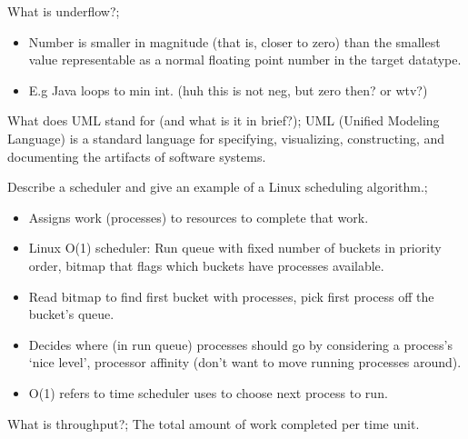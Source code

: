 \documentclass{article}
\begin{document}
What is underflow?; \begin{itemize} \item Number is smaller in magnitude (that is, closer to zero) than the smallest value representable as a normal floating point number in the target datatype. \item E.g Java loops to min int. (huh this is not neg, but zero then? or wtv?) \end{itemize}

What does UML stand for (and what is it in brief?); UML (Unified Modeling Language) is a standard language for specifying, visualizing, constructing, and documenting the artifacts of software systems. 

Describe a scheduler and give an example of a Linux scheduling algorithm.; \begin{itemize} \item Assigns work (processes) to resources to complete that work. \item Linux O(1) scheduler: Run queue with fixed number of buckets in priority order, bitmap that flags which buckets have processes available. \item Read bitmap to find first bucket with processes, pick first process off the bucket's queue. \item Decides where (in run queue) processes should go by considering a process's `nice level', processor affinity (don't want to move running processes around). \item O(1) refers to time scheduler uses to choose next process to run. \end{itemize}

What is throughput?; The total amount of work completed per time unit.
\end{document}
